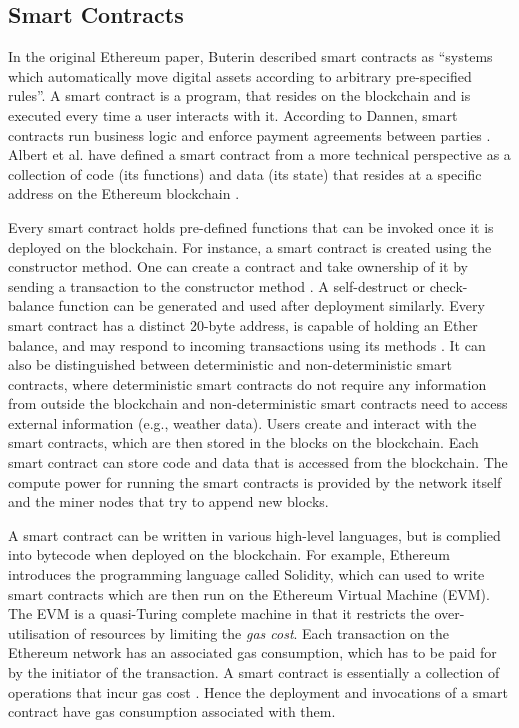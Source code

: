 \documentclass[10pt,conference]{IEEEtran}
\begin{document}
	\subsection{Smart Contracts}
	In the original Ethereum paper, Buterin described smart contracts as ``systems which automatically move digital assets according to arbitrary pre-specified rules''\cite{ethpaper}. A smart contract is a program, that resides on the blockchain and is executed every time a user interacts with it. According to Dannen, smart contracts run business logic and enforce payment agreements between parties \cite{bitcoinbook}. Albert et al. have defined a smart contract from a more technical perspective as a collection of code (its functions) and data (its state) that resides at a specific address on the Ethereum blockchain \cite{gasol}. 
	
	Every smart contract holds pre-defined functions that can be invoked once it is deployed on the blockchain. For instance, a smart contract is created using the constructor method. One can create a contract and take ownership of it by sending a transaction to the constructor method \cite{wood2019ethereum, khanblockchain}. A self-destruct or check-balance function can be generated and used after deployment similarly. Every smart contract has a distinct 20-byte address, is capable of holding an Ether balance, and may respond to incoming transactions using its methods \cite{alharbyblockchain}. It can also be distinguished between deterministic and non-deterministic smart contracts, where deterministic smart contracts do not require any information from outside the blockchain and non-deterministic smart contracts need to access external information (e.g., weather data)\cite{morabito}. Users create and interact with the smart contracts, which are then stored in the blocks on the blockchain. Each smart contract can store code and data that is accessed from the blockchain. The compute power for running the smart contracts is provided by the network itself and the miner nodes that try to append new blocks.
	
	A smart contract can be written in various high-level languages, but is complied into bytecode when deployed on the blockchain. For example, Ethereum introduces the programming language called Solidity, which can used to write smart contracts which are then run on the Ethereum Virtual Machine (EVM). The EVM is a quasi-Turing complete machine \cite{wood2019ethereum} in that it restricts the over-utilisation of resources by limiting the \textit{gas cost}. Each transaction on the Ethereum network has an associated gas consumption, which has to be paid for by the initiator of the transaction. A smart contract is essentially a collection of operations that incur gas cost \cite{wood2019ethereum}. Hence the deployment and invocations of a smart contract have gas consumption associated with them.
	
\end{document}
